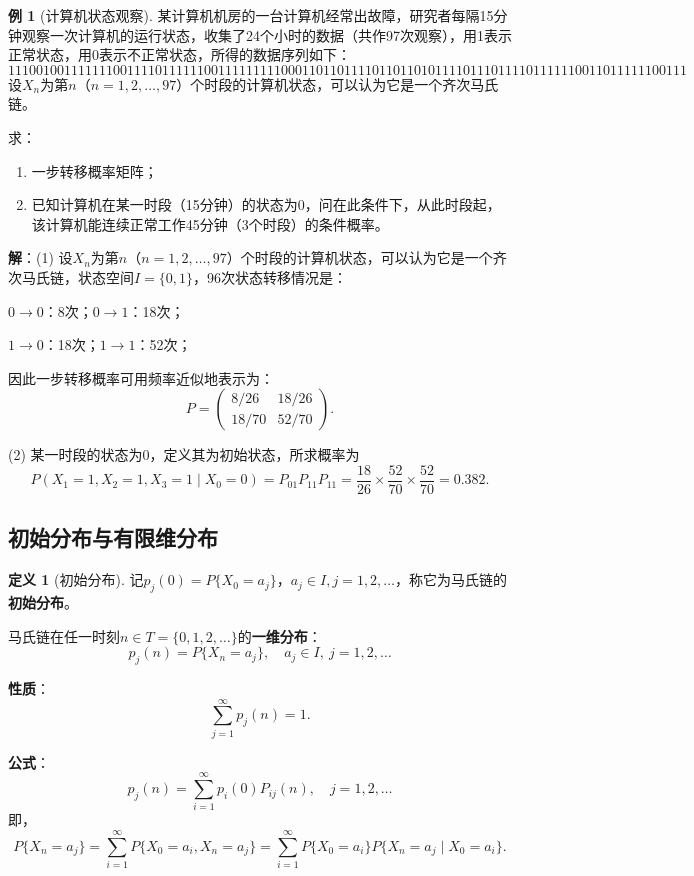 \documentclass[11pt,a4paper]{report}
\theoremstyle{definition}
\newtheorem{definition}{定义}[chapter]
\newtheorem{example}{例}[chapter]
\begin{document}
\begin{example}[计算机状态观察]
某计算机机房的一台计算机经常出故障，研究者每隔15分钟观察一次计算机的运行状态，收集了24个小时的数据（共作97次观察），用1表示正常状态，用0表示不正常状态，所得的数据序列如下：
\[
1110010011111110011110111111001111111110001101101111011011010111101110111101111110011011111100111
\]
设$X_n$为第$n$（$n=1,2,\ldots,97$）个时段的计算机状态，可以认为它是一个齐次马氏链。

求：
\begin{enumerate}[label=(\arabic*)]
    \item 一步转移概率矩阵；
    \item 已知计算机在某一时段（15分钟）的状态为0，问在此条件下，从此时段起，该计算机能连续正常工作45分钟（3个时段）的条件概率。
\end{enumerate}

\textbf{解}：(1) 设$X_n$为第$n$（$n=1,2,\ldots,97$）个时段的计算机状态，可以认为它是一个齐次马氏链，状态空间$I=\{0,1\}$，96次状态转移情况是：

$0\to0$：8次；\quad$0\to1$：18次；

$1\to0$：18次；\quad$1\to1$：52次；

因此一步转移概率可用频率近似地表示为：
\[
P=
\begin{pmatrix}
8/26 & 18/26\\
18/70 & 52/70
\end{pmatrix}.
\]

(2) 某一时段的状态为0，定义其为初始状态，所求概率为
\[
P(X_1=1,X_2=1,X_3=1\mid X_0=0)=P_{01}P_{11}P_{11}=\frac{18}{26}\times\frac{52}{70}\times\frac{52}{70}=0.382.
\]
\end{example}

\subsection{初始分布与有限维分布}

\begin{definition}[初始分布]
记$p_j(0)=P\{X_0=a_j\}$，$a_j\in I,j=1,2,\ldots$，称它为马氏链的\textbf{初始分布}。
\end{definition}

马氏链在任一时刻$n\in T=\{0,1,2,\ldots\}$的\textbf{一维分布}：
\[
p_j(n)=P\{X_n=a_j\},\quad a_j\in I,\ j=1,2,\ldots
\]

\textbf{性质}：
\[
\sum_{j=1}^{\infty}p_j(n)=1.
\]

\textbf{公式}：
\[
p_j(n)=\sum_{i=1}^{\infty}p_i(0)P_{ij}(n),\quad j=1,2,\ldots
\]
即，
\[
P\{X_n=a_j\}=\sum_{i=1}^{\infty}P\{X_0=a_i,X_n=a_j\}=\sum_{i=1}^{\infty}P\{X_0=a_i\}P\{X_n=a_j\mid X_0=a_i\}.
\]
\end{document}

